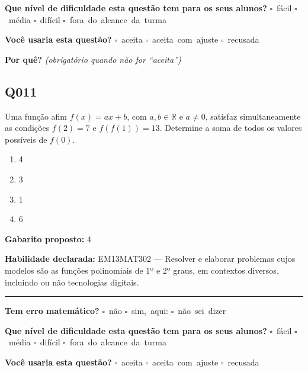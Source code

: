 \documentclass[11pt,a4paper]{article}
\begin{document}
\textbf{Que nível de dificuldade esta questão tem para os seus alunos?}\quad
\mbox{$\square$~fácil} \quad \mbox{$\square$~média} \quad
\mbox{$\square$~difícil} \quad \mbox{$\square$~fora do alcance da turma}

\textbf{Você usaria esta questão?}\quad
\mbox{$\square$~aceita} \quad \mbox{$\square$~aceita com ajuste} \quad
\mbox{$\square$~recusada}

\textbf{Por quê?} \emph{(obrigatório quando não for ``aceita'')}

\underline{\hspace{\linewidth}}

\underline{\hspace{\linewidth}}
\vspace{0.6em}

\begin{samepage}
\subsection*{Q011}
Uma função afim $f(x) = ax + b$, com $a, b \in \mathbb{R}$ e $a \neq 0$, satisfaz simultaneamente as condições $f(2) = 7$ e $f(f(1)) = 13$. Determine a soma de todos os valores possíveis de $f(0)$.
\begin{enumerate}[label=(\alph*),nosep,leftmargin=*]
\item 4
\item 3
\item 1
\item 6
\end{enumerate}

\textbf{Gabarito proposto:} 4

\textbf{Habilidade declarada:} EM13MAT302 --- Resolver e elaborar problemas cujos modelos são as funções polinomiais de 1º e 2º graus, em contextos diversos, incluindo ou não tecnologias digitais.
\end{samepage}

\noindent\rule{\linewidth}{0.4pt}
\textbf{Tem erro matemático?}\quad
\mbox{$\square$~não} \quad \mbox{$\square$~sim, aqui:} \underline{\hspace{5cm}}
\quad \mbox{$\square$~não sei dizer}

\textbf{Que nível de dificuldade esta questão tem para os seus alunos?}\quad
\mbox{$\square$~fácil} \quad \mbox{$\square$~média} \quad
\mbox{$\square$~difícil} \quad \mbox{$\square$~fora do alcance da turma}

\textbf{Você usaria esta questão?}\quad
\mbox{$\square$~aceita} \quad \mbox{$\square$~aceita com ajuste} \quad
\mbox{$\square$~recusada}
\end{document}
